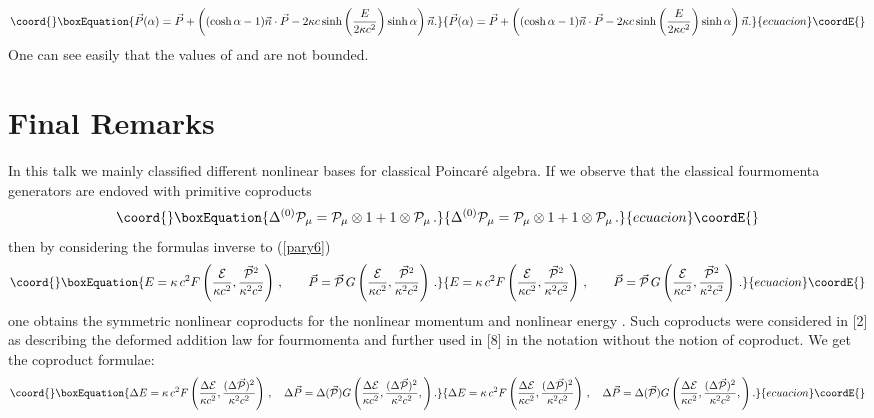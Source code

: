 \documentclass[a4paper,12pt]{article} \usepackage{times}
\begin{document}
\begin{equation}\coord{}\boxEquation{
\vec{P}(\alpha)  =  \vec{P} +
\left((\cosh\alpha-1)\vec{n}\cdot\vec{P} - 2\kappa c \sinh
\left(\frac{E}{2\kappa c^2}\right) \sinh\alpha\right)\vec{n} .
}{
\vec{P}(\alpha)  =  \vec{P} +
\left((\cosh\alpha-1)\vec{n}\cdot\vec{P} - 2\kappa c \sinh
\left(\frac{E}{2\kappa c^2}\right) \sinh\alpha\right)\vec{n} .
}{ecuacion}\coordE{}\end{equation}
One can see easily  that the values of \coordHE{} and \coordHE{}
are not bounded.

\section{Final Remarks}


In this talk we mainly classified   different  nonlinear
bases for classical Poincar\'{e} algebra. If we observe that the
classical fourmomenta generators are endoved with primitive
coproducts \coordHE{}
\begin{equation}\coord{}\boxEquation{\label{pary31}
  \Delta^{(0)}  {\cal P}_{\mu} = {\cal P}_\mu \otimes 1 + 1 \otimes
  {\cal P}_\mu\, .
}{\Delta^{(0)}  {\cal P}_{\mu} = {\cal P}_\mu \otimes 1 + 1 \otimes
  {\cal P}_\mu\, .
}{ecuacion}\coordE{}\end{equation}
then by considering the formulas inverse to (\ref{pary6})
\begin{equation}\coord{}\boxEquation{\label{pary32}
E = \kappa \, c^2 F\left(\frac{\cal E}{\kappa c^2},
\frac{\vec{\cal P}^2}{\kappa^2
  c^2}\right)\, ,
  \qquad
  \vec{P} = \vec{\cal P} \, G \left(
  \frac{\cal E}{\kappa c^2}, \frac{\vec{\cal P}^2}{\kappa^2
  c^2}\right)\, .
}{E = \kappa \, c^2 F\left(\frac{\cal E}{\kappa c^2},
\frac{\vec{\cal P}^2}{\kappa^2
  c^2}\right)\, ,
  \qquad
  \vec{P} = \vec{\cal P} \, G \left(
  \frac{\cal E}{\kappa c^2}, \frac{\vec{\cal P}^2}{\kappa^2
  c^2}\right)\, .
}{ecuacion}\coordE{}\end{equation}
one obtains the symmetric nonlinear coproducts for the nonlinear
momentum \coordHE{} and nonlinear energy \coordHE{}.
 Such coproducts were considered in [2] as  describing the 
deformed
  addition law for fourmomenta
 and
further used in [8]  in the notation without the notion of coproduct.
 We get  the coproduct formulae:
\begin{equation}\coord{}\boxEquation{\label{pary33}
  \Delta { E} = \kappa \,  c^2 F \left(
  \frac{\Delta{\cal E}}{\kappa c^2},
  \frac{(\Delta \vec{\cal P})^2}{\kappa^2  c^2}\right)\, ,\quad
  \Delta \vec{P} = \Delta (\vec{\cal P}) G
  \left(
  \frac{\Delta {\cal E}}{\kappa c^2},
  \frac{(\Delta \vec{\cal P})^2}{\kappa^2 c^2},
  \right) .
}{\Delta { E} = \kappa \,  c^2 F \left(
  \frac{\Delta{\cal E}}{\kappa c^2},
  \frac{(\Delta \vec{\cal P})^2}{\kappa^2  c^2}\right)\, ,\quad
  \Delta \vec{P} = \Delta (\vec{\cal P}) G
  \left(
  \frac{\Delta {\cal E}}{\kappa c^2},
  \frac{(\Delta \vec{\cal P})^2}{\kappa^2 c^2},
  \right) .
}{ecuacion}\coordE{}\end{equation}
\end{document}
